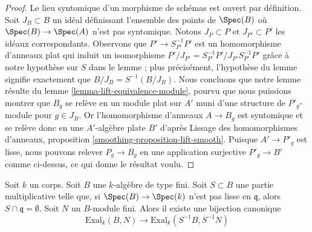 \begin{proof}
\medskip\noindent
Le lieu syntomique d'un morphisme de schémas est ouvert par définition.
Soit $J_B \subset B$ un idéal définissant l'ensemble des points
de $\Spec(B)$ où $\Spec(B) \to \Spec(A)$ n'est pas syntomique.
Notons $J_P \subset P$ et $J_{P'} \subset P'$ les idéaux
correspondants. Observons que $P' \to S_{P'}^{-1}P'$ est un homomorphisme d'anneaux plat qui
induit un isomorphisme $P'/J_{P'} = S_{P'}^{-1}P'/J_{P'}S_{P'}^{-1}P'$
grâce à notre hypothèse sur $S$ dans le lemme ; plus précisément, l'hypothèse
du lemme signifie exactement que $B/J_B = S^{-1}(B/J_B)$.
Nous concluons que notre lemme résulte du
lemme \ref{lemma-lift-equivalence-module}, pourvu que nous puissions
montrer que $B_g$ se relève en un module plat sur $A'$ muni d'une structure de $P'_g$-module pour
$g \in J_B$. Or l'homomorphisme d'anneaux $A \to B_g$ est syntomique
et se relève donc en une $A'$-algèbre plate $B'$ d'après
Lissage des homomorphismes d'anneaux, proposition \ref{smoothing-proposition-lift-smooth}.
Puisque $A' \to P'_g$ est lisse, nous pouvons relever $P_g \to B_g$
en une application surjective $P'_g \to B'$ comme ci-dessus, ce qui donne le résultat voulu.
\end{proof}

\begin{lemma}
\label{lemma-first-order-localization}
Soit $k$ un corps. Soit $B$ une $k$-algèbre de type fini.
Soit $S \subset B$ une partie multiplicative telle que,
si $\Spec(B) \to \Spec(k)$ n'est pas lisse en $\mathfrak q$,
alors $S \cap \mathfrak q = \emptyset$.
Soit $N$ un $B$-module fini.
Alors il existe une bijection canonique
$$
\text{Exal}_k(B, N) \to \text{Exal}_k(S^{-1}B, S^{-1}N)
$$
\end{lemma}

